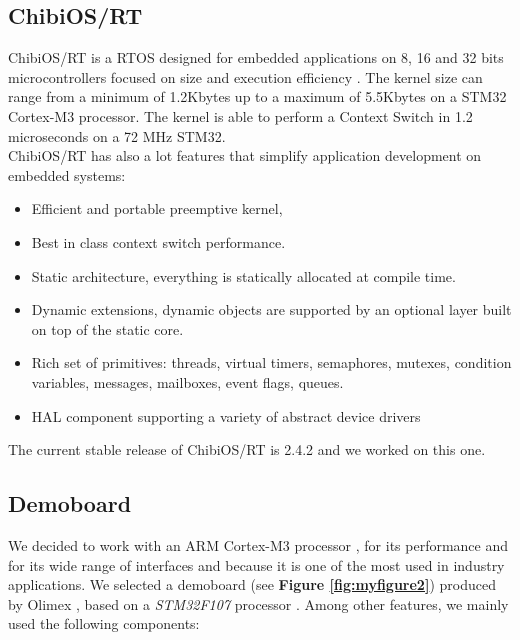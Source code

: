 \documentclass[a4paper,10pt]{article}
\begin{document}
\begin{multicols}{2}
\subsection{ChibiOS/RT}

ChibiOS/RT is a RTOS designed for embedded applications on 8, 16 and 32 bits microcontrollers focused on size and execution efficiency \cite{wikiChibi}. The kernel size can range from a minimum of 1.2Kbytes up to a maximum of 5.5Kbytes  on a STM32 Cortex-M3 processor. The kernel is able to perform a Context Switch in 1.2 microseconds on a 72 MHz STM32.\\
ChibiOS/RT has also a lot features \cite{chibiHP} that simplify application development on embedded systems:

\begin{itemize}
\item Efficient and portable preemptive kernel,
\item Best in class context switch performance.
\item Static architecture, everything is statically allocated at compile time.
\item Dynamic extensions, dynamic objects are supported by an optional layer built on top of the static core.
\item Rich set of primitives: threads, virtual timers, semaphores, mutexes, condition variables, messages, mailboxes, event flags, queues.
\item HAL component supporting a variety of abstract device drivers
\end{itemize}

The current stable release of ChibiOS/RT is 2.4.2 and we worked on this one.


\subsection{Demoboard}

We decided to work with an ARM Cortex\texttrademark-M3 processor \cite{armcm3}, for its performance and for its wide range of interfaces and because it is one of the most used in industry applications. We selected a demoboard (see {\bf Figure \ref{fig:myfigure2}}) produced by Olimex \cite{olimex}, based on a \textit{STM32F107} processor \cite{stm32f107}.
Among other features, we mainly used the following components:


\end{multicols}
\end{document}
